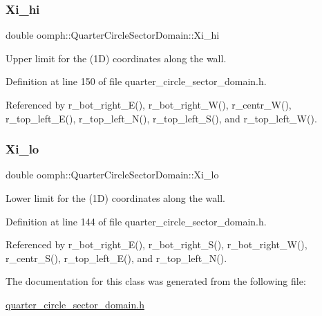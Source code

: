\mbox{\label{classoomph_1_1QuarterCircleSectorDomain_aba0cc67782144fe066dd0d04ac9d79dd}} 
\subsubsection{\texorpdfstring{Xi\+\_\+hi}{Xi\_hi}}
{\footnotesize\ttfamily double oomph\+::\+Quarter\+Circle\+Sector\+Domain\+::\+Xi\+\_\+hi\hspace{0.3cm}{\ttfamily [private]}}



Upper limit for the (1D) coordinates along the wall. 



Definition at line 150 of file quarter\+\_\+circle\+\_\+sector\+\_\+domain.\+h.



Referenced by r\+\_\+bot\+\_\+right\+\_\+\+E(), r\+\_\+bot\+\_\+right\+\_\+\+W(), r\+\_\+centr\+\_\+\+W(), r\+\_\+top\+\_\+left\+\_\+\+E(), r\+\_\+top\+\_\+left\+\_\+\+N(), r\+\_\+top\+\_\+left\+\_\+\+S(), and r\+\_\+top\+\_\+left\+\_\+\+W().

\mbox{\label{classoomph_1_1QuarterCircleSectorDomain_afed5ccc21ccf6c6cd1dca65d58a5b708}} 
\subsubsection{\texorpdfstring{Xi\+\_\+lo}{Xi\_lo}}
{\footnotesize\ttfamily double oomph\+::\+Quarter\+Circle\+Sector\+Domain\+::\+Xi\+\_\+lo\hspace{0.3cm}{\ttfamily [private]}}



Lower limit for the (1D) coordinates along the wall. 



Definition at line 144 of file quarter\+\_\+circle\+\_\+sector\+\_\+domain.\+h.



Referenced by r\+\_\+bot\+\_\+right\+\_\+\+E(), r\+\_\+bot\+\_\+right\+\_\+\+S(), r\+\_\+bot\+\_\+right\+\_\+\+W(), r\+\_\+centr\+\_\+\+S(), r\+\_\+top\+\_\+left\+\_\+\+E(), and r\+\_\+top\+\_\+left\+\_\+\+N().



The documentation for this class was generated from the following file\+:\begin{DoxyCompactItemize}
\item 
\hyperlink{quarter__circle__sector__domain_8h}{quarter\+\_\+circle\+\_\+sector\+\_\+domain.\+h}\end{DoxyCompactItemize}
